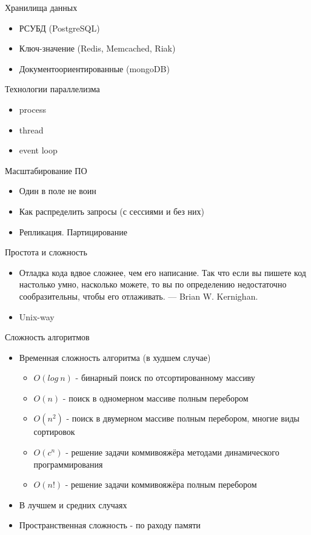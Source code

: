 \documentclass[aspectratio=169]{beamer}
\begin{document}
\begin{frame}{Хранилища данных}
\begin{itemize}
\item РСУБД (PostgreSQL)
\pause
\item Ключ-значение (Redis, Memcached, Riak)
\pause
\item Документоориентированные (mongoDB)
\end{itemize}
\end{frame}

\begin{frame}{Технологии параллелизма}
\begin{itemize}
\item process
\pause
\item thread
\pause
\item event loop
\end{itemize}
\end{frame}

\begin{frame}{Масштабирование ПО}
\begin{itemize}
\item Один в поле не воин
\pause
\item Как распределить запросы (с сессиями и без них)
\pause
\item Репликация. Партицирование
\end{itemize}
\end{frame}

\begin{frame}{Простота и сложность}
\begin{itemize}
\item Отладка кода вдвое сложнее, чем его написание. Так что если вы пишете код настолько умно, насколько можете, то вы по определению недостаточно сообразительны, чтобы его отлаживать. — Brian W. Kernighan.
\pause
\item Unix-way
\end{itemize}
\end{frame}

\begin{frame}{Сложность алгоритмов}
\begin{itemize}
\item Временная сложность алгоритма (в худшем случае)
\begin{itemize}
\item $O(log \: n)$ - бинарный поиск по отсортированному массиву
\item $O(n)$ - поиск в одномерном массиве полным перебором
\item $O(n^2)$ - поиск в двумерном массиве полным перебором, многие виды сортировок
\item $O(c^n)$ - решение задачи коммивояжёра методами динамического программирования
\item $O(n!)$ - решение задачи коммивояжёра полным перебором
\end{itemize}
\pause
\item В лучшем и средних случаях
\pause
\item Пространственная сложность - по раходу памяти
\end{itemize}
\end{frame}
\end{document}
